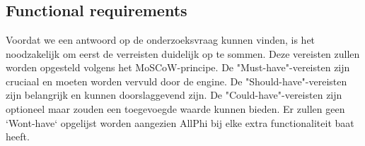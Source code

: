 
\chapter{}%
\label{ch:requirements-analyse}


\section{Functional requirements}
Voordat we een antwoord op de onderzoeksvraag kunnen vinden, is het noodzakelijk om eerst de verreisten duidelijk op te sommen. Deze vereisten zullen worden opgesteld volgens het MoSCoW-principe. De "Must-have"-vereisten zijn cruciaal en moeten worden vervuld door de engine. De "Should-have"-vereisten zijn belangrijk en kunnen doorslaggevend zijn. De "Could-have"-vereisten zijn optioneel maar zouden een toegevoegde waarde kunnen bieden. Er zullen geen `Wont-have` opgelijst worden aangezien AllPhi bij elke extra functionaliteit baat heeft.
